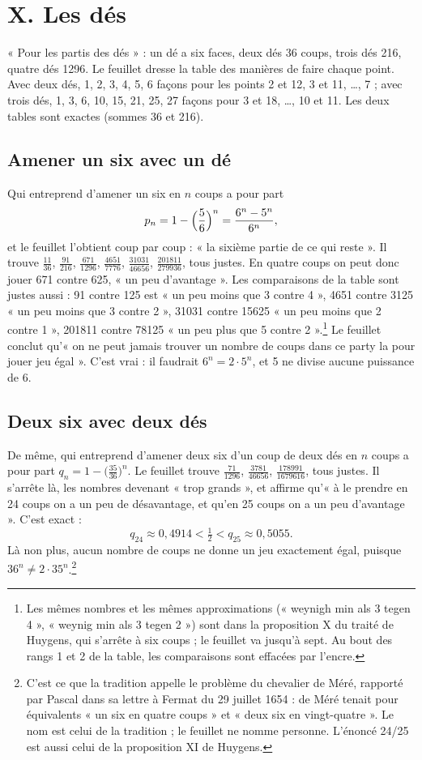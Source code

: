 \documentclass[11pt,a4paper]{article}
\begin{document}
\section*{X. Les dés}

« Pour les partis des dés » : un dé a six faces, deux dés 36 coups, trois dés
216, quatre dés 1296. Le feuillet dresse la table des manières de faire chaque
point. Avec deux dés, 1, 2, 3, 4, 5, 6 façons pour les points 2 et 12, 3 et 11,
\ldots, 7 ; avec trois dés, 1, 3, 6, 10, 15, 21, 25, 27 façons pour 3 et 18,
\ldots, 10 et 11. Les deux tables sont exactes (sommes 36 et 216).

\subsection*{Amener un six avec un dé}

Qui entreprend d'amener un six en \(n\) coups a pour part
\[
p_n=1-\Bigl(\frac56\Bigr)^n=\frac{6^n-5^n}{6^n},
\]
et le feuillet l'obtient coup par coup : « la sixième partie de ce qui reste ».
Il trouve \(\frac{11}{36}\), \(\frac{91}{216}\), \(\frac{671}{1296}\),
\(\frac{4651}{7776}\), \(\frac{31031}{46656}\), \(\frac{201811}{279936}\), tous
justes. En quatre coups on peut donc jouer 671 contre 625, « un peu
d'avantage ». Les comparaisons de la table sont justes aussi : 91 contre 125
est « un peu moins que 3 contre 4 », 4651 contre 3125 « un peu moins que 3
contre 2 », 31031 contre 15625 « un peu moins que 2 contre 1 », 201811 contre
78125 « un peu plus que 5 contre 2 ».\footnote{Les mêmes nombres et les mêmes
approximations (« weynigh min als 3 tegen 4 », « weynig min als 3 tegen 2 »)
sont dans la proposition X du traité de Huygens, qui s'arrête à six coups ; le
feuillet va jusqu'à sept. Au bout des rangs 1 et 2 de la table, les
comparaisons sont effacées par l'encre.} Le feuillet conclut qu'« on ne peut
jamais trouver un nombre de coups dans ce party la pour jouer jeu égal ».
C'est vrai : il faudrait \(6^n=2\cdot5^n\), et 5 ne divise aucune puissance de
6.

\subsection*{Deux six avec deux dés}

De même, qui entreprend d'amener deux six d'un coup de deux dés en \(n\) coups a
pour part \(q_n=1-\bigl(\frac{35}{36}\bigr)^n\). Le feuillet trouve
\(\frac{71}{1296}\), \(\frac{3781}{46656}\), \(\frac{178991}{1679616}\), tous
justes. Il s'arrête là, les nombres devenant « trop grands », et affirme
qu'« à le prendre en 24 coups on a un peu de désavantage, et qu'en 25 coups on
a un peu d'avantage ». C'est exact :
\[
q_{24}\approx0{,}4914<\tfrac12<q_{25}\approx0{,}5055 .
\]
Là non plus, aucun nombre de coups ne donne un jeu exactement égal, puisque
\(36^n\neq2\cdot35^n\).\footnote{C'est ce que la tradition appelle le problème
du chevalier de Méré, rapporté par Pascal dans sa lettre à Fermat du 29 juillet
1654 : de Méré tenait pour équivalents « un six en quatre coups » et « deux six
en vingt-quatre ». Le nom est celui de la tradition ; le feuillet ne nomme
personne. L'énoncé 24/25 est aussi celui de la proposition XI de Huygens.}
\end{document}
